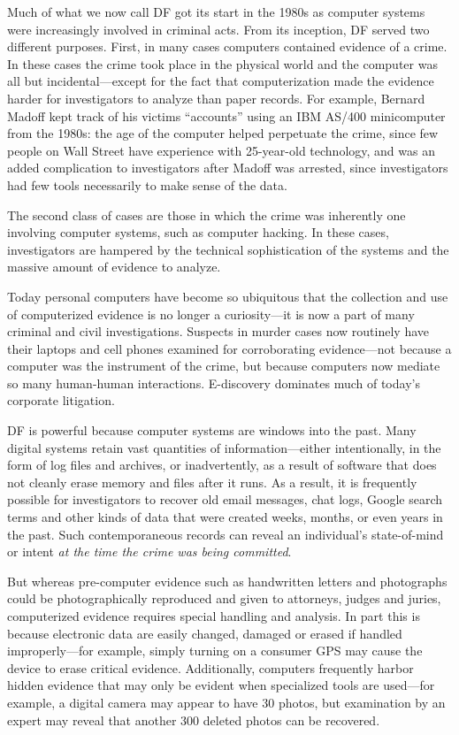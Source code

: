 Much of what we now call DF got its start in the 1980s
as computer systems were increasingly involved in criminal acts.
From its inception, DF served two different
purposes. First, in many cases computers contained evidence of a
crime. In these cases the crime took place in the physical world
and the computer was all but incidental---except for the fact that
computerization made the evidence harder for
investigators to analyze than paper records. For example, Bernard Madoff kept track of
his victims ``accounts'' using an IBM AS/400 minicomputer from the
1980s: the age of the computer  helped perpetuate the crime, since few
people on Wall Street have experience with 25-year-old technology, and
was an added complication to investigators after Madoff was
arrested\cite{technology-madoff}, since investigators had few tools
necessarily to make sense of the data.

The second class of cases are those in
which the crime was inherently one involving computer systems, such as
computer hacking. In these cases, investigators are hampered
by the technical sophistication of the systems and the massive amount
of evidence to analyze.

Today personal computers have become so
ubiquitous that the collection and use of computerized evidence is no
longer a curiosity---it is now a part of many criminal and civil
investigations. Suspects in murder cases now routinely have their
laptops and cell phones examined for corroborating evidence---not
because a computer was the instrument of the crime, but because
computers now mediate so many human-human interactions. 
E-discovery dominates much of today's corporate litigation.

DF is powerful because computer systems are windows into the
past. Many digital systems retain vast quantities of
information---either intentionally, in the form of log files and
archives, or inadvertently, as a result of software that does not
cleanly erase memory and files after it runs. As a result, it
is frequently possible for investigators to recover old email
messages, chat logs,   Google search terms and other kinds of data
that were created
weeks, months, or even years in the past. Such contemporaneous records
can reveal an individual's state-of-mind or intent \emph{at the time
  the crime was being committed}.

But whereas pre-computer evidence such as handwritten letters and
photographs could be photographically reproduced and given to attorneys, judges and juries, computerized evidence
requires special handling and analysis. In part this is because
electronic data are easily changed, damaged or erased if
handled improperly---for example, simply turning on a consumer GPS
may cause the device to erase critical evidence. Additionally,  computers
frequently harbor hidden evidence that may only be evident when
specialized tools are used---for example, a digital camera may appear to have
30 photos, but examination by an expert may reveal that another 300
deleted photos can be recovered.

